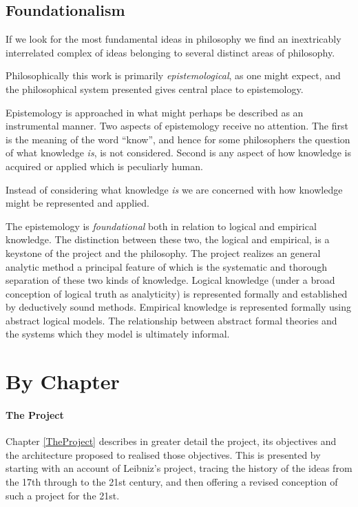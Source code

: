 \subsection{Foundationalism}

If we look for the most fundamental ideas in philosophy we find an
inextricably interrelated complex of ideas belonging to several
distinct areas of philosophy.

Philosophically this work is primarily \emph{epistemological}, as one
might expect, and the philosophical system presented gives central
place to epistemology. 

Epistemology is approached in what might perhaps be described as an
instrumental manner.
Two aspects of epistemology receive no attention.
The first is the meaning of the word ``know'', and hence for some
philosophers the question of what knowledge \emph{is}, is not
considered.
Second is any aspect of how knowledge is acquired or applied which is
peculiarly human.

Instead of considering what knowledge \emph{is} we are concerned with
how knowledge might be represented and applied.

The epistemology is \emph{foundational} both in relation to logical
and empirical knowledge.
The distinction between these two, the logical and empirical, is a
keystone of the project and the philosophy.
The project realizes an general analytic method a principal feature of
which is the systematic and thorough separation of these two kinds of
knowledge.
Logical knowledge (under a broad conception of logical truth as
analyticity) is represented formally and established by deductively
sound methods.
Empirical knowledge is represented formally using abstract logical
models.
The relationship between abstract formal theories and the systems
which they model is ultimately informal.

\section{By Chapter}

\paragraph{The Project}

Chapter \ref{TheProject} describes in greater detail the project,
its objectives and the architecture proposed to realised those objectives.
This is presented by starting with an account of Leibniz's project,
tracing the history of the ideas from the 17th through to the
21st century, and then offering a revised conception of such a
project for the 21st.

